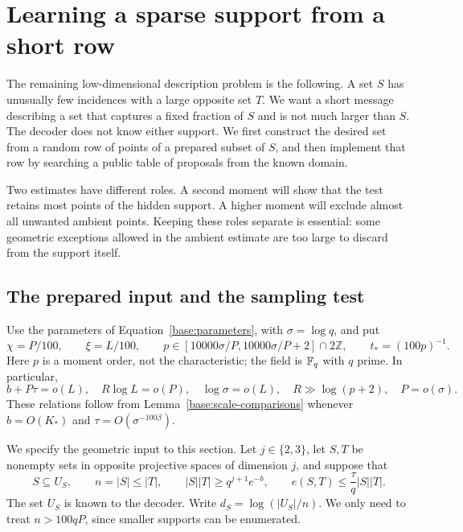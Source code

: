\section{Learning a sparse support from a short row}
\label{learn:section}

The remaining low-dimensional description problem is the following.
A set $S$ has unusually few incidences with a large opposite set $T$.
We want a short message describing a set that captures a fixed fraction
of $S$ and is not much larger than $S$. The decoder does not know either
support. We first construct the desired set from a random row of points
of a prepared subset of $S$, and then implement that row by searching a
public table of proposals from the known domain.

Two estimates have different roles. A second moment will show that the
test retains most points of the hidden support. A higher moment will
exclude almost all unwanted ambient points. Keeping these roles separate
is essential: some geometric exceptions allowed in the ambient estimate
are too large to discard from the support itself.

\subsection{The prepared input and the sampling test}

Use the parameters of Equation~\eqref{base:parameters}, with
$\sigma=\log q$, and put
\begin{equation}\label{learn:auxiliary-parameters}
 \chi=P/100,\qquad \xi=L/100,\qquad
 p\in[10000\sigma/P,10000\sigma/P+2]\cap2\mathbb Z,
 \qquad t_*=(100p)^{-1}.
\end{equation}
Here $p$ is a moment order, not the characteristic; the field is $\mathbb F_q$
with $q$ prime. In particular,
\begin{equation}\label{learn:scale-use}
 b+P\tau=o(L),\quad R\log L=o(P),\quad
 \log\sigma=o(L),\quad R\gg\log(p+2),\quad P=o(\sigma).
\end{equation}
These relations follow from Lemma~\ref{base:scale-comparisons} whenever
$b=O(K_*)$ and $\tau=O(\sigma^{-100\beta})$.

We specify the geometric input to this section. Let $j\in\{2,3\}$,
let $S,T$ be nonempty sets in opposite projective spaces of dimension
$j$, and suppose that
\begin{equation}\label{learn:support-hypotheses}
 S\subseteq U_S,\qquad n=|S|\le |T|,\qquad
 |S||T|\ge q^{j+1}e^{-b},\qquad
 e(S,T)\le \frac{\tau}{q}|S||T|.
\end{equation}
The set $U_S$ is known to the decoder. Write
$d_S=\log(|U_S|/n)$. We only need to treat
$n>100qP$, since smaller supports can be enumerated.

